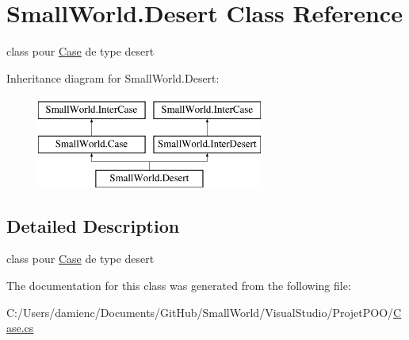 \hypertarget{class_small_world_1_1_desert}{\section{Small\-World.\-Desert Class Reference}
\label{class_small_world_1_1_desert}
}


class pour \hyperlink{class_small_world_1_1_case}{Case} de type desert  


Inheritance diagram for Small\-World.\-Desert\-:\begin{figure}[H]
\begin{center}
\leavevmode
\includegraphics[height=3.000000cm]{class_small_world_1_1_desert}
\end{center}
\end{figure}


\subsection{Detailed Description}
class pour \hyperlink{class_small_world_1_1_case}{Case} de type desert 

The documentation for this class was generated from the following file\-:\begin{DoxyCompactItemize}
\item 
C\-:/\-Users/damienc/\-Documents/\-Git\-Hub/\-Small\-World/\-Visual\-Studio/\-Projet\-P\-O\-O/\hyperlink{_case_8cs}{Case.\-cs}\end{DoxyCompactItemize}
